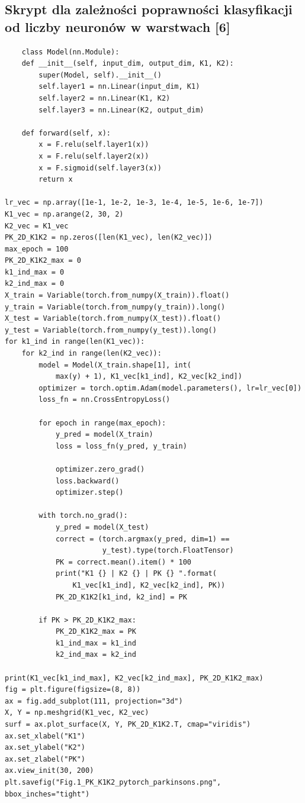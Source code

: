 \documentclass{article}
\begin{document}
\subsection{Skrypt dla zależności poprawności klasyfikacji od liczby neuronów w warstwach [6]}
\begin{verbatim}
    class Model(nn.Module):
    def __init__(self, input_dim, output_dim, K1, K2):
        super(Model, self).__init__()
        self.layer1 = nn.Linear(input_dim, K1)
        self.layer2 = nn.Linear(K1, K2)
        self.layer3 = nn.Linear(K2, output_dim)

    def forward(self, x):
        x = F.relu(self.layer1(x))
        x = F.relu(self.layer2(x))
        x = F.sigmoid(self.layer3(x))
        return x

lr_vec = np.array([1e-1, 1e-2, 1e-3, 1e-4, 1e-5, 1e-6, 1e-7])
K1_vec = np.arange(2, 30, 2)
K2_vec = K1_vec
PK_2D_K1K2 = np.zeros([len(K1_vec), len(K2_vec)])
max_epoch = 100
PK_2D_K1K2_max = 0
k1_ind_max = 0
k2_ind_max = 0
X_train = Variable(torch.from_numpy(X_train)).float()
y_train = Variable(torch.from_numpy(y_train)).long()
X_test = Variable(torch.from_numpy(X_test)).float()
y_test = Variable(torch.from_numpy(y_test)).long()
for k1_ind in range(len(K1_vec)):
    for k2_ind in range(len(K2_vec)):
        model = Model(X_train.shape[1], int(
            max(y) + 1), K1_vec[k1_ind], K2_vec[k2_ind])
        optimizer = torch.optim.Adam(model.parameters(), lr=lr_vec[0])
        loss_fn = nn.CrossEntropyLoss()

        for epoch in range(max_epoch):
            y_pred = model(X_train)
            loss = loss_fn(y_pred, y_train)

            optimizer.zero_grad()
            loss.backward()
            optimizer.step()

        with torch.no_grad():
            y_pred = model(X_test)
            correct = (torch.argmax(y_pred, dim=1) ==
                       y_test).type(torch.FloatTensor)
            PK = correct.mean().item() * 100
            print("K1 {} | K2 {} | PK {} ".format(
                K1_vec[k1_ind], K2_vec[k2_ind], PK))
            PK_2D_K1K2[k1_ind, k2_ind] = PK

        if PK > PK_2D_K1K2_max:
            PK_2D_K1K2_max = PK
            k1_ind_max = k1_ind
            k2_ind_max = k2_ind

print(K1_vec[k1_ind_max], K2_vec[k2_ind_max], PK_2D_K1K2_max)
fig = plt.figure(figsize=(8, 8))
ax = fig.add_subplot(111, projection="3d")
X, Y = np.meshgrid(K1_vec, K2_vec)
surf = ax.plot_surface(X, Y, PK_2D_K1K2.T, cmap="viridis")
ax.set_xlabel("K1")
ax.set_ylabel("K2")
ax.set_zlabel("PK")
ax.view_init(30, 200)
plt.savefig("Fig.1_PK_K1K2_pytorch_parkinsons.png", bbox_inches="tight")
\end{verbatim}
\end{document}
